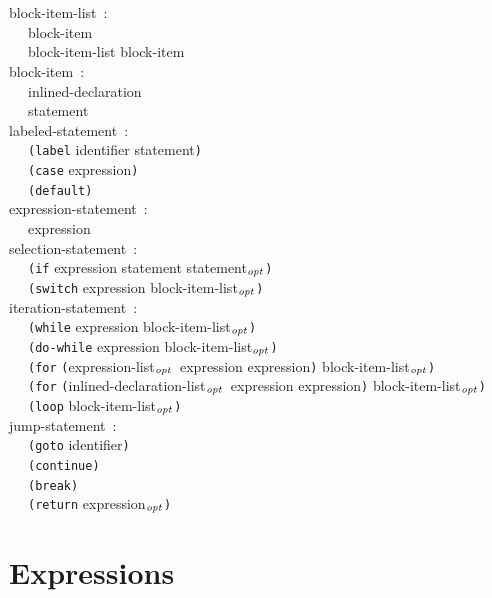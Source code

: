 \documentclass[a4]{article}
\def\|{\verb|} %|
\newcommand{\opt}{$_{{\it opt}}$}
\begin{document}
\noindent
block-item-list{\rm \ :} \\
\|  | block-item \\
\|  | block-item-list block-item \\

\noindent
block-item{\rm \ :} \\
\|  | inlined-declaration \\
\|  | statement \\

\noindent
labeled-statement{\rm \ :} \\
\|  | {\tt (label} identifier statement{\tt )} \\
\|  | {\tt (case} expression{\tt )} \\
\|  | {\tt (default)} \\

\noindent
expression-statement{\rm \ :} \\
\|  | expression \\

\noindent
selection-statement{\rm \ :} \\
\|  | {\tt (if} expression statement statement\opt{\tt )} \\
\|  | {\tt (switch} expression block-item-list\opt{\tt )} \\

\noindent
iteration-statement{\rm \ :} \\
\|  | {\tt (while} expression block-item-list\opt{\tt )} \\
\|  | {\tt (do-while} expression block-item-list\opt{\tt )} \\
\|  | {\tt (for} {\tt (}expression-list\opt\ expression expression{\tt )} block-item-list\opt{\tt )} \\
\|  | {\tt (for} {\tt (}inlined-declaration-list\opt\ expression expression{\tt )} block-item-list\opt{\tt )} \\
\|  | {\tt (loop} block-item-list\opt{\tt )} \\

\noindent
jump-statement{\rm \ :} \\
\|  | {\tt (goto} identifier{\tt )} \\
\|  | {\tt (continue)} \\
\|  | {\tt (break)} \\
\|  | {\tt (return} expression\opt{\tt )} \\
\rm
\section{Expressions}
\it
\end{document}

